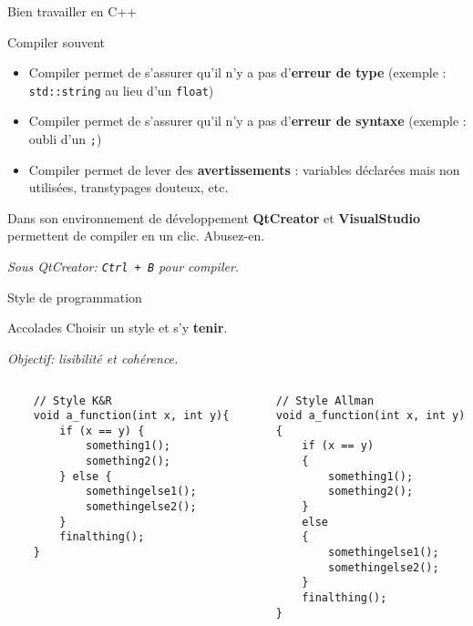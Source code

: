 
\date[31 janv. 2022]{Lundi 31 janvier 2022}
\subtitle{Bonnes pratiques de programmation en C++}
\maketitle

\begin{frame}{Bien travailler en C++}

\begin{block}{Compiler souvent}
    \begin{itemize}
        \item Compiler permet de s'assurer qu'il n'y a pas d'\textbf{erreur de type} (exemple : \texttt{std::string} au lieu d'un \texttt{float})
        \item Compiler permet de s'assurer qu'il n'y a pas d'\textbf{erreur de syntaxe} (exemple : oubli d'un \texttt{;})
        \item Compiler permet de lever des \textbf{avertissements} : variables déclarées mais non utilisées, transtypages douteux, etc.
    \end{itemize}
\end{block}

\begin{block}{Dans son environnement de développement}
\textbf{QtCreator} et \textbf{VisualStudio} permettent de compiler en un clic. Abusez-en.

\emph{Sous QtCreator: \texttt{Ctrl + B} pour compiler.}
\end{block}

\end{frame}

\begin{frame}[fragile]{Style de programmation}

\begin{block}{Accolades}
Choisir un style et s'y \textbf{tenir}.

\emph{Objectif: lisibilité et cohérence.}
\end{block}


\begin{columns}[T]
    \begin{column}{0.5\textwidth}
    \begin{verbatim}
    // Style K&R
    void a_function(int x, int y){
        if (x == y) {
            something1();
            something2();
        } else {
            somethingelse1();
            somethingelse2();
        }
        finalthing();
    }
    \end{verbatim}
    \end{column}
    \begin{column}{0.5\textwidth}
    \begin{verbatim}
    // Style Allman
    void a_function(int x, int y)
    {
        if (x == y)
        {
            something1();
            something2();
        }
        else
        {
            somethingelse1();
            somethingelse2();
        }
        finalthing();
    }
    \end{verbatim}
    \end{column}
\end{columns}
\end{frame}

